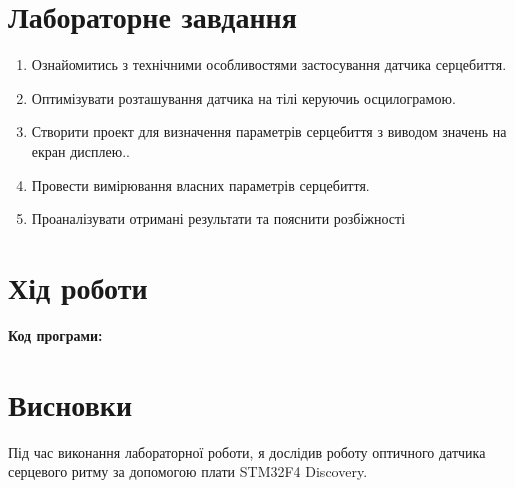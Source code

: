 \documentclass[oneside,14pt]{extarticle}
\begin{document}
\begin{normalsize}
    \section*{\hfil Лабораторне завдання\hfil}
	\begin{enumerate}
		\item Ознайомитись з технічними особливостями застосування датчика серцебиття.
		\item Оптимізувати розташування датчика на тілі керуючиь осцилограмою.
		\item Створити проект для визначення параметрів серцебиття з виводом значень на екран дисплею..
		\item Провести вимірювання власних параметрів серцебиття.
		\item Проаналізувати отримані результати та пояснити розбіжності
	\end{enumerate}

	\section*{\hfil Хід роботи\hfil}
	
	\textbf{Код програми:}
	
	
	\section*{\hfil Висновки\hfil}
	Під час виконання лабораторної роботи, я дослідив роботу оптичного датчика серцевого ритму за допомогою плати
	STM32F4 Discovery.
		    
\end{normalsize}
\end{document}
